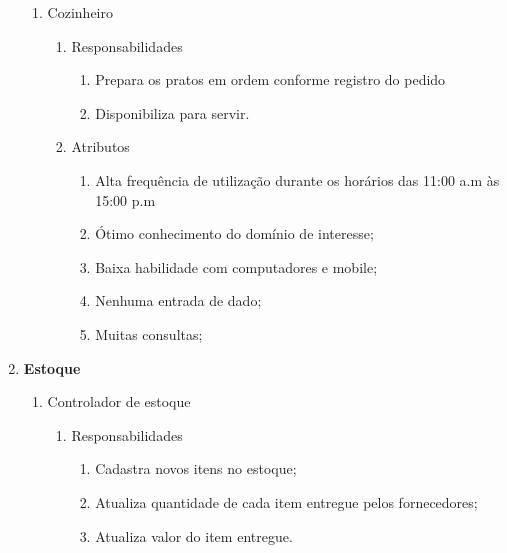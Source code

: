 \begin{enumerate}
\begin{enumerate}
      \item Cozinheiro

      \begin{enumerate}
        \item Responsabilidades

          \begin{enumerate}
            \item Prepara os pratos em ordem conforme registro do pedido 
            \item Disponibiliza para servir.
          \end{enumerate}

        \item Atributos

          \begin{enumerate}
            \item Alta frequência de utilização durante os horários das 11:00 a.m às 15:00 p.m
            \item Ótimo conhecimento do domínio de interesse;
            \item Baixa habilidade com computadores e mobile;
            \item Nenhuma entrada de dado;
            \item Muitas consultas;
          \end{enumerate}
      \end{enumerate}

    \end{enumerate}

\item \textbf{Estoque}

    \begin{enumerate}

      

      \item Controlador de estoque

      \begin{enumerate}
        \item Responsabilidades

          \begin{enumerate}
              \item Cadastra novos itens no estoque;
              \item Atualiza quantidade de cada item entregue pelos fornecedores;
              \item Atualiza valor do item entregue.
          \end{enumerate}


\end{enumerate}
\end{enumerate}
\end{enumerate}
